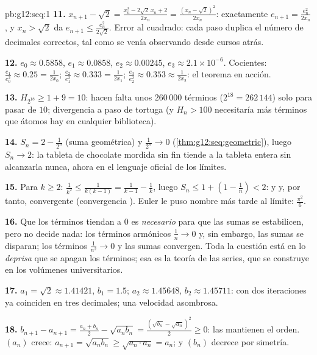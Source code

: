 \begin{solution}{pb:g12:seq:1}
\textbf{11.} $x_{n+1} - \sqrt2 = \frac{x_n^2 - 2\sqrt2\,x_n + 2}{2x_n} =
\frac{(x_n - \sqrt2)^2}{2x_n}$: exactamente
$e_{n+1} = \frac{e_n^2}{2x_n}$, y $x_n > \sqrt2$ da
$e_{n+1} \leq \frac{e_n^2}{2\sqrt2}$. Error al cuadrado: cada paso duplica
el número de decimales correctos, tal como se venía observando desde
cursos atrás.

\textbf{12.} $e_0 \approx 0.5858$, $e_1 \approx 0.0858$,
$e_2 \approx 0.00245$, $e_3 \approx 2.1 \times 10^{-6}$. Cocientes:
$\frac{e_1}{e_0^2} \approx 0.25 = \frac{1}{2x_0}$;
$\frac{e_2}{e_1^2} \approx 0.333 = \frac{1}{2x_1}$;
$\frac{e_3}{e_2^2} \approx 0.353 \approx \frac{1}{2x_2}$: el teorema en
acción.

\textbf{13.} $H_{2^{18}} \geq 1 + 9 = 10$: hacen falta unos
$260\,000$ términos ($2^{18} = 262\,144$) solo para pasar de $10$;
divergencia a paso de tortuga (y $H_n > 100$ necesitaría más términos que
átomos hay en cualquier biblioteca).

\textbf{14.} $S_n = 2 - \frac{1}{2^n}$ (suma geométrica) y
$\frac{1}{2^n} \to 0$ (\cref{thm:g12:seq:geometric}), luego $S_n \to 2$:
la tableta de chocolate mordida sin fin tiende a la tableta entera sin
alcanzarla nunca, ahora en el lenguaje oficial de los límites.

\textbf{15.} Para $k \geq 2$:
$\frac{1}{k^2} \leq \frac{1}{k(k-1)} = \frac{1}{k-1} - \frac1k$, luego
$S_n \leq 1 + \left(1 - \frac1n\right) < 2$:  y  y, por tanto, convergente (convergencia ). Euler le
puso nombre más tarde al límite: $\frac{\pi^2}{6}$.

\textbf{16.} Que los términos tiendan a $0$ es \emph{necesario} para que
las sumas se estabilicen, pero no decide nada: los términos armónicos
$\frac1n \to 0$ y, sin embargo, las sumas se disparan; los términos
$\frac{1}{n^2} \to 0$ y las sumas convergen. Toda la cuestión está en lo
\emph{deprisa} que se apagan los términos; esa es la teoría de las series,
que se construye en los volúmenes universitarios.

\textbf{17.} $a_1 = \sqrt2 \approx 1.41421$, $b_1 = 1.5$;
$a_2 \approx 1.45648$, $b_2 \approx 1.45711$: con dos iteraciones ya
coinciden en tres decimales; una velocidad asombrosa.

\textbf{18.} $b_{n+1} - a_{n+1} = \frac{a_n + b_n}{2} - \sqrt{a_n b_n} =
\frac{(\sqrt{b_n} - \sqrt{a_n})^2}{2} \geq 0$: las  mantienen el
orden. $(a_n)$ crece:
$a_{n+1} = \sqrt{a_n b_n} \geq \sqrt{a_n \cdot a_n} = a_n$; y $(b_n)$
decrece por simetría.


\end{solution}

